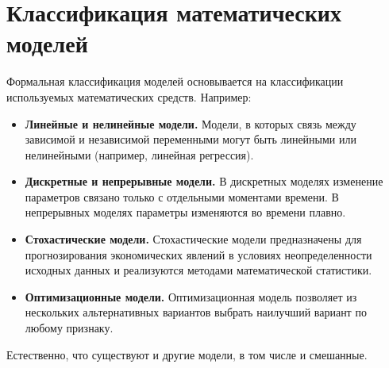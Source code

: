 \section{Классификация математических моделей}

Формальная классификация моделей основывается на классификации используемых математических средств.
Например:
\begin{itemize}
	\item \textbf{Линейные и нелинейные модели.}
	Модели, в которых связь между зависимой и независимой переменными могут быть линейными или нелинейными (например, линейная регрессия).
	\item \textbf{Дискретные и непрерывные модели.}
	В дискретных моделях изменение параметров связано только с отдельными моментами времени.
	В непрерывных моделях параметры изменяются во времени плавно.
	\item \textbf{Стохастические модели.}
	Стохастические модели предназначены для прогнозирования экономических явлений в условиях неопределенности исходных данных и реализуются методами математической статистики.
	\item \textbf{Оптимизационные модели.}
	Оптимизационная модель позволяет из нескольких альтернативных вариантов выбрать наилучший вариант по любому признаку.
\end{itemize}

Естественно, что существуют и другие модели, в том числе и смешанные.
